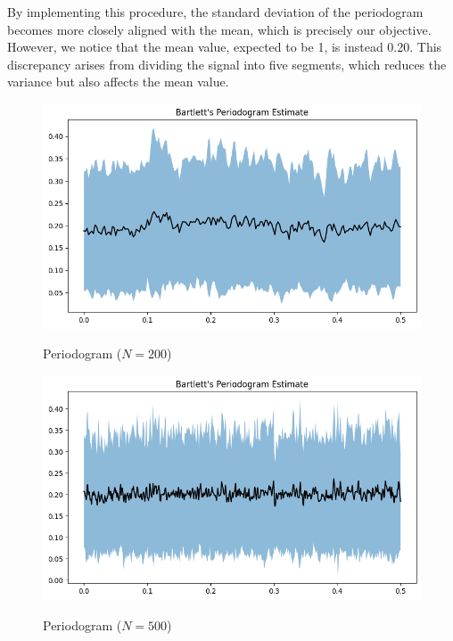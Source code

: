 \documentclass[11pt]{article}
\begin{document}
\begin{solution}
   By implementing this procedure, the standard deviation of the periodogram becomes more closely aligned with the mean, which is precisely our objective. However, we notice that the mean value, expected to be 1, is instead 0.20. This discrepancy arises from dividing the signal into five segments, which reduces the variance but also affects the mean value.
\begin{figure}
    \centering
    \begin{minipage}[t]{0.3\textwidth}
    \centerline{\includegraphics[width=\textwidth]{img/Bartlett_periodogramm_200.png}}
    \centerline{Periodogram ($N=200$)}
    \end{minipage}
    \begin{minipage}[t]{0.3\textwidth}
    \centerline{\includegraphics[width=\textwidth]{img/Bartlett_periodogramm_500.png}}
    \centerline{Periodogram ($N=500$)}
    \end{minipage}
    \begin{minipage}[t]{0.3\textwidth}

\end{minipage}
\end{figure}
\end{solution}
\end{document}

